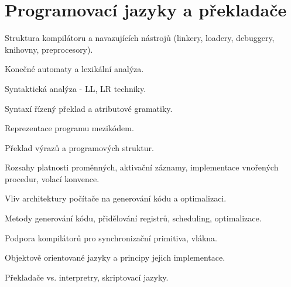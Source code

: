 \newpage
\section{Programovací jazyky a překladače}
\begin{pozadavky}
\begin{pitemize}
\item Struktura kompilátoru a navazujících nástrojů (linkery, loadery, debuggery, knihovny, preprocesory).
\item Konečné automaty a lexikální analýza.
\item Syntaktická analýza - LL, LR techniky.
\item Syntaxí řízený překlad a atributové gramatiky.
\item Reprezentace programu mezikódem.
\item Překlad výrazů a programových struktur.
\item Rozsahy platnosti proměnných, aktivační záznamy, implementace vnořených procedur, volací konvence.
\item Vliv architektury počítače na generování kódu a optimalizaci.
\item Metody generování kódu, přidělování registrů, scheduling, optimalizace.
\item Podpora kompilátorů pro synchronizační primitiva, vlákna.
\item Objektově orientované jazyky a principy jejich implementace.
\item Překladače vs. interpretry, skriptovací jazyky.
\end{pitemize}
\end{pozadavky}

